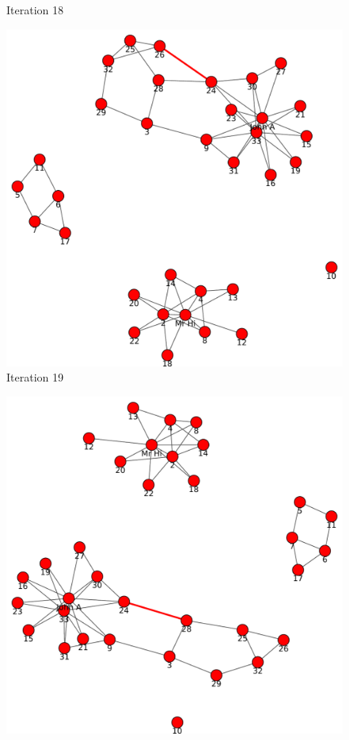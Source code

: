 \begin{itemize}
\begin{figure}[h!]
\begin{center}
\caption{Iteration 18}
\label{fig:q2fig9}
\end{center}
\end{figure}
\newpage
\begin{figure}[h!]
\begin{center}
\includegraphics[scale=0.55, keepaspectratio=true]{figures/graphs/EdgeHighlightedGraph19.pdf}
\caption{Iteration 19}
\label{fig:q2fig10}
\end{center}
\end{figure}
\newpage
\begin{figure}[h!]
\begin{center}
\includegraphics[scale=0.55, keepaspectratio=true]{figures/graphs/EdgeHighlightedGraph20.pdf}

\end{center}
\end{figure}
\end{itemize}
